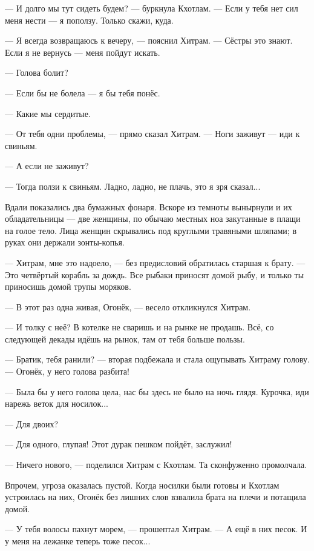 \asterism

--- И долго мы тут сидеть будем? --- буркнула Кхотлам.
--- Если у тебя нет сил меня нести --- я поползу.
Только скажи, куда.

--- Я всегда возвращаюсь к вечеру, --- пояснил Хитрам.
--- Сёстры это знают.
Если я не вернусь --- меня пойдут искать.

--- Голова болит?

--- Если бы не болела --- я бы тебя понёс.

--- Какие мы сердитые.

--- От тебя одни проблемы, --- прямо сказал Хитрам.
--- Ноги заживут --- иди к свиньям.

--- А если не заживут?

--- Тогда ползи к свиньям.
Ладно, ладно, не плачь, это я зря сказал...

Вдали показались два бумажных фонаря.
Вскоре из темноты вынырнули и их обладательницы --- две женщины, по обычаю местных ноа закутанные в плащи на голое тело.
Лица женщин скрывались под круглыми травяными шляпами;
в руках они держали зонты-копья.

--- Хитрам, мне это надоело, --- без предисловий обратилась старшая к брату.
--- Это четвёртый корабль за дождь.
Все рыбаки приносят домой рыбу, и только ты приносишь домой трупы моряков.

--- В этот раз одна живая, Огонёк, --- весело откликнулся Хитрам.

--- И толку с неё?
В котелке не сваришь и на рынке не продашь.
Всё, со следующей декады идёшь на рынок, там от тебя больше пользы.

--- Братик, тебя ранили? --- вторая подбежала и стала ощупывать Хитраму голову.
--- Огонёк, у него голова разбита!

--- Была бы у него голова цела, нас бы здесь не было на ночь глядя.
Курочка, иди нарежь веток для носилок...

--- Для двоих?

--- Для одного, глупая!
Этот дурак пешком пойдёт, заслужил!

--- Ничего нового, --- поделился Хитрам с Кхотлам.
Та сконфуженно промолчала.

Впрочем, угроза оказалась пустой.
Когда носилки были готовы и Кхотлам устроилась на них, Огонёк без лишних слов взвалила брата на плечи и потащила домой.

\asterism

--- У тебя волосы пахнут морем, --- прошептал Хитрам.
--- А ещё в них песок.
И у меня на лежанке теперь тоже песок...

